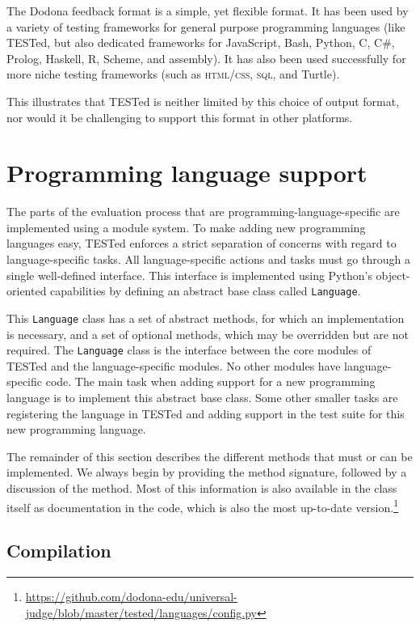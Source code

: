 \documentclass[../main]{subfiles}
\begin{document}
The Dodona feedback format is a simple, yet flexible format.
It has been used by a variety of testing frameworks for general purpose programming languages (like TESTed, but also dedicated frameworks for JavaScript, Bash, Python, C, C\#, Prolog, Haskell, R, Scheme, and assembly).
It has also been used successfully for more niche testing frameworks (such as \textsc{html}/\textsc{css}, \textsc{sql}, and Turtle).

This illustrates that TESTed is neither limited by this choice of output format, nor would it be challenging to support this format in other platforms.

\section{Programming language support}\label{sec:programming-language-support}

The parts of the evaluation process that are programming-language-specific are implemented using a module system.
To make adding new programming languages easy, TESTed enforces a strict separation of concerns with regard to language-specific tasks.
All language-specific actions and tasks must go through a single well-defined interface.
This interface is implemented using Python's object-oriented capabilities by defining an abstract base class called \texttt{Language}.

This \texttt{Language} class has a set of abstract methods, for which an implementation is necessary, and a set of optional methods, which may be overridden but are not required.
The \texttt{Language} class is the interface between the core modules of TESTed and the language-specific modules.
No other modules have language-specific code.
The main task when adding support for a new programming language is to implement this abstract base class.
Some other smaller tasks are registering the language in TESTed and adding support in the test suite for this new programming language.

The remainder of this section describes the different methods that must or can be implemented.
We always begin by providing the method signature, followed by a discussion of the method.
Most of this information is also available in the class itself as documentation in the code, which is also the most up-to-date version.\footnote{\url{https://github.com/dodona-edu/universal-judge/blob/master/tested/languages/config.py}}

\subsection{Compilation}\label{subsec:impl-compilation}
\end{document}
